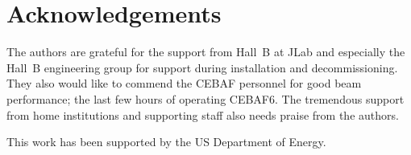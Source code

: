 \documentclass[final,3p,times,twocolumn]{elsarticle}
\begin{document}



\section{Acknowledgements}
The authors are grateful for the support from Hall~B at JLab and especially the Hall~B engineering 
group for support during installation and decommissioning. They also would like to commend the 
CEBAF personnel for good beam performance; the last few hours of operating CEBAF6. 
The tremendous support from home institutions and supporting staff also needs praise from the 
authors. 

This work has been supported by the US Department of Energy. 


\end{document}
